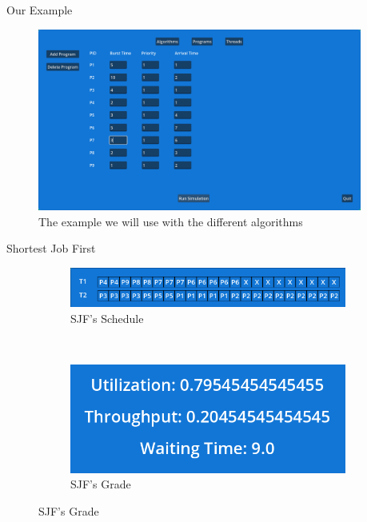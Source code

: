 \documentclass{beamer}
\begin{document}
\begin{frame}{Our Example}
	\begin{figure}
		\begin{center}
			\includegraphics[width=0.95\textwidth]{Example.png}
		\end{center}
		\caption*{The example we will use with the different algorithms}
	\end{figure}
\end{frame}

\begin{frame}{Shortest Job First}
	\centering
	\begin{figure}[h!]
		\begin{subfigure}{0.9\textwidth}
			\includegraphics[width=1\textwidth]{SJFSchedule.png}
			\caption*{\large SJF's Schedule}
		\end{subfigure} \\
		\begin{subfigure}{0.6\textwidth}
			\includegraphics[width=1\textwidth]{SJFGrade.png}
			\caption*{\large SJF's Grade}
		\end{subfigure}
	\end{figure}
\end{frame}
\end{document}
